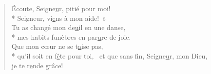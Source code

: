\begin{verse}
Écoute, Seigne\underline{u}r, pitié pour moi! \\*
Seigneur, vi\underline{e}ns à mon aide! » \\

Tu as changé mon de\underline{u}il en une danse, \\*
mes habits funèbres en par\underline{u}re de joie. \\

Que mon cœur ne se t\underline{a}ise pas, \\*
qu’il soit en f\underline{ê}te pour toi,~\psalmstar
et que sans fin, Seigne\underline{u}r, mon Dieu, \\
je te r\underline{e}nde grâce! \\
\end{verse}

